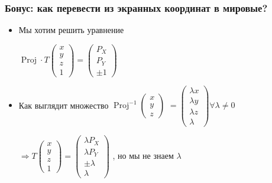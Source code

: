 \documentclass[10pt]{beamer}
\begin{document}
\begin{frame}[fragile]
\frametitle{Бонус: как перевести из экранных координат в мировые?}
\begin{itemize}
\item Мы хотим решить уравнение
\begin{center}
\begin{math}
\operatorname{Proj}\cdot T \begin{pmatrix}x \\ y \\ z \\ 1\end{pmatrix} = \begin{pmatrix}P_X \\ P_Y \\ \pm 1\end{pmatrix}
\end{math}
\end{center}
\pause
\item Как выглядит множество \begin{math}\operatorname{Proj}^{-1} \begin{pmatrix}x \\ y \\ z\end{pmatrix}\end{math} \pause \begin{math}=\begin{pmatrix}\lambda x \\ \lambda y \\ \lambda z \\ \lambda \end{pmatrix} \forall \lambda  \neq 0\end{math}
\pause
\begin{center}
\begin{math}
\Rightarrow T \begin{pmatrix}x \\ y \\ z \\ 1\end{pmatrix} = \begin{pmatrix}\lambda P_X \\ \lambda P_Y \\ \pm \lambda \\ \lambda\end{pmatrix}
\end{math}
, но мы не знаем \begin{math}\lambda\end{math}
\end{center}
\end{itemize}
\end{frame}
\end{document}
